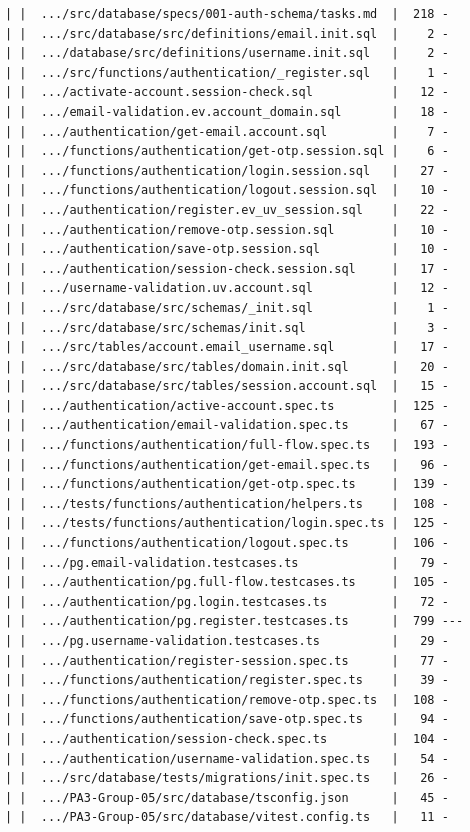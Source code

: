 \documentclass[12pt]{article}
\begin{document}
\begin{lstlisting}[numbers=none,breaklines=true]
| |  .../src/database/specs/001-auth-schema/tasks.md  |  218 -
| |  .../src/database/src/definitions/email.init.sql  |    2 -
| |  .../database/src/definitions/username.init.sql   |    2 -
| |  .../src/functions/authentication/_register.sql   |    1 -
| |  .../activate-account.session-check.sql           |   12 -
| |  .../email-validation.ev.account_domain.sql       |   18 -
| |  .../authentication/get-email.account.sql         |    7 -
| |  .../functions/authentication/get-otp.session.sql |    6 -
| |  .../functions/authentication/login.session.sql   |   27 -
| |  .../functions/authentication/logout.session.sql  |   10 -
| |  .../authentication/register.ev_uv_session.sql    |   22 -
| |  .../authentication/remove-otp.session.sql        |   10 -
| |  .../authentication/save-otp.session.sql          |   10 -
| |  .../authentication/session-check.session.sql     |   17 -
| |  .../username-validation.uv.account.sql           |   12 -
| |  .../src/database/src/schemas/_init.sql           |    1 -
| |  .../src/database/src/schemas/init.sql            |    3 -
| |  .../src/tables/account.email_username.sql        |   17 -
| |  .../src/database/src/tables/domain.init.sql      |   20 -
| |  .../src/database/src/tables/session.account.sql  |   15 -
| |  .../authentication/active-account.spec.ts        |  125 -
| |  .../authentication/email-validation.spec.ts      |   67 -
| |  .../functions/authentication/full-flow.spec.ts   |  193 -
| |  .../functions/authentication/get-email.spec.ts   |   96 -
| |  .../functions/authentication/get-otp.spec.ts     |  139 -
| |  .../tests/functions/authentication/helpers.ts    |  108 -
| |  .../tests/functions/authentication/login.spec.ts |  125 -
| |  .../functions/authentication/logout.spec.ts      |  106 -
| |  .../pg.email-validation.testcases.ts             |   79 -
| |  .../authentication/pg.full-flow.testcases.ts     |  105 -
| |  .../authentication/pg.login.testcases.ts         |   72 -
| |  .../authentication/pg.register.testcases.ts      |  799 ---
| |  .../pg.username-validation.testcases.ts          |   29 -
| |  .../authentication/register-session.spec.ts      |   77 -
| |  .../functions/authentication/register.spec.ts    |   39 -
| |  .../functions/authentication/remove-otp.spec.ts  |  108 -
| |  .../functions/authentication/save-otp.spec.ts    |   94 -
| |  .../authentication/session-check.spec.ts         |  104 -
| |  .../authentication/username-validation.spec.ts   |   54 -
| |  .../src/database/tests/migrations/init.spec.ts   |   26 -
| |  .../PA3-Group-05/src/database/tsconfig.json      |   45 -
| |  .../PA3-Group-05/src/database/vitest.config.ts   |   11 -

\end{lstlisting}
\end{document}
